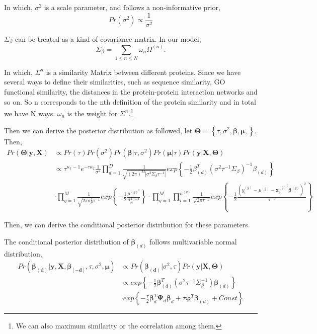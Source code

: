 \documentclass[paper=a4, fontsize=11pt]{scrartcl}
\numberwithin{equation}{section}		%
\numberwithin{figure}{section}			%
\numberwithin{table}{section}				%
\begin{document}
In which, $\sigma^{2}$ is a scale parameter, and follows a non-informative prior,
\begin{equation}
Pr(\sigma^2) \propto \frac{1}{\sigma^2}
\end{equation}

$\Sigma_{\beta}$ can be treated as a kind of covariance matrix. In our model,
\begin{equation}
\Sigma_{\beta} = \sum_{1\leq n \leq N}\omega_{n}\Omega^{(n)}.
\end{equation}

In which, $\Sigma^{n}$ is a similarity Matrix between different proteins. Since we have several ways to define their similarities, such as sequence similarity, GO functional similarity, the distances in the protein-protein interaction networks and so on. So n corresponds to the nth definition of the protein similarity and in total we have N ways. $\omega_{n}$ is the weight for $\Sigma^{n}$.\footnote{We can also maximum similarity or the correlation among them.}

Then we can derive the posterior distribution as followed, let $\bm{\Theta} = \left\{\tau, \sigma^{2},\bm{\beta},\bm{\mu},\right\}$. Then,
\begin{equation}
\begin{aligned}
  Pr(\bm{\Theta}|\bm{y},\bm{X}) & \propto Pr(\tau)Pr(\sigma^{2})Pr(\bm{\beta}|\tau,\sigma^{2})Pr(\bm{\mu}|\tau)
  Pr(\bm{y}|\bm{X},\bm{\Theta})\\
  & \propto\tau^{\kappa_{1}-1}e^{-\tau \kappa_{2}}\frac{1}{\sigma^{2}}\prod_{d=1}^{D}\frac{1}{\sqrt{(2\pi)^{M}
  \left|\sigma^2\Sigma_{\beta}\tau^{-1}\right|}}exp\left\{-\frac{1}{2}
  \beta_{(d)}^{T}\left(\sigma^2\tau^{-1}\Sigma_{\beta}\right)^{-1}\beta_{(d)}\right\}\\
  &\cdot \prod_{g=1}^{M}\frac{1}{\sqrt{2\pi \sigma_{\mu}^2\tau^{-1}}}exp\left\{-\frac{1}{2}\frac{\mu^{(g)^{2}}}
  {\sigma_{\mu}^2\tau^{-1}}\right\}\cdot \prod_{g=1}^{M}\prod_{i=1}^{n^{(g)}}\frac{1}{\sqrt{2\pi\tau^{-1}}}exp\left\{-
  \frac{1}{2}\frac{\left(y_{i}^{(g)}-\mu^{(g)}-\bm{x}_{i}^{(g)^T}\bm{\beta}^{(g)}
  \right)^2}{\tau^{-1}}\right\}
\end{aligned}
\end{equation}

Then, we can derive the conditional posterior distribution for these parameters.

The conditional posterior distribution of $\bm{\beta}_{(d)}$ follows multivariable normal distribution,
\begin{equation}
\begin{aligned}
  Pr(\bm{\beta_{(d)}}|\bm{y},\bm{X},\bm{\beta_{[-d]}},\tau,\sigma^2,\bm{\mu})
  & \propto Pr(\bm{\beta_{(d)}}|\sigma^2,\tau)Pr(\bm{y}|\bm{X},\bm{\Theta})\\
  & \propto exp\left\{-\frac{1}{2}\bm{\beta}_{(d)}^T(\sigma^2\tau^{-1}\Sigma_{\beta}^{-1})
  \bm{\beta}_{(d)}\right\}\\
  & \cdot exp\left\{-\frac{\tau}{2}\bm{\beta}_{d}^T\bm{\Psi}_{d}\bm{\beta}_{d}
  +\tau\bm{\varphi}^T\bm{\beta}_{(d)}+Const\right\}
\end{aligned}
\end{equation}
\end{document}
